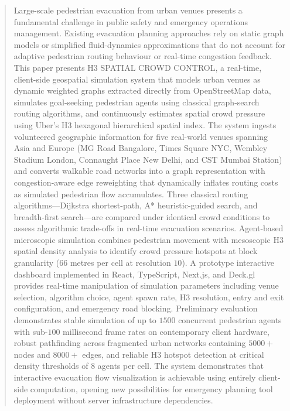 \documentclass[conference]{IEEEtran}
\begin{document}
\begin{abstract}
Large-scale pedestrian evacuation from urban venues presents a fundamental challenge in public safety and emergency operations management. Existing evacuation planning approaches rely on static graph models or simplified fluid-dynamics approximations that do not account for adaptive pedestrian routing behaviour or real-time congestion feedback. This paper presents H3 SPATIAL CROWD CONTROL, a real-time, client-side geospatial simulation system that models urban venues as dynamic weighted graphs extracted directly from OpenStreetMap data, simulates goal-seeking pedestrian agents using classical graph-search routing algorithms, and continuously estimates spatial crowd pressure using Uber's H3 hexagonal hierarchical spatial index. The system ingests volunteered geographic information for five real-world venues spanning Asia and Europe (MG Road Bangalore, Times Square NYC, Wembley Stadium London, Connaught Place New Delhi, and CST Mumbai Station) and converts walkable road networks into a graph representation with congestion-aware edge reweighting that dynamically inflates routing costs as simulated pedestrian flow accumulates. Three classical routing algorithms—Dijkstra shortest-path, A* heuristic-guided search, and breadth-first search—are compared under identical crowd conditions to assess algorithmic trade-offs in real-time evacuation scenarios. Agent-based microscopic simulation combines pedestrian movement with mesoscopic H3 spatial density analysis to identify crowd pressure hotspots at block granularity ($66$ metres per cell at resolution $10$). A prototype interactive dashboard implemented in React, TypeScript, Next.js, and Deck.gl provides real-time manipulation of simulation parameters including venue selection, algorithm choice, agent spawn rate, H3 resolution, entry and exit configuration, and emergency road blocking. Preliminary evaluation demonstrates stable simulation of up to $1500$ concurrent pedestrian agents with sub-$100$ millisecond frame rates on contemporary client hardware, robust pathfinding across fragmented urban networks containing $5000+$ nodes and $8000+$ edges, and reliable H3 hotspot detection at critical density thresholds of $8$ agents per cell. The system demonstrates that interactive evacuation flow visualization is achievable using entirely client-side computation, opening new possibilities for emergency planning tool deployment without server infrastructure dependencies.
\end{abstract}
\end{document}
